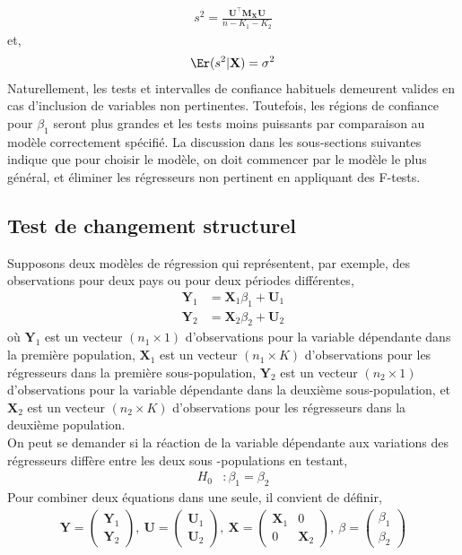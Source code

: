 \begin{align*}
s^2 = \frac{\mathbf{U}^\top\mathbf{M}_\mathbf{X}\mathbf{U}}{n-K_1-K_2}
\end{align*}
et,
\begin{align*}
\Er(s^2|\mathbf{X}) = \sigma^2
\end{align*}
Naturellement, les tests et intervalles de confiance habituels demeurent valides en cas d'inclusion de variables non pertinentes. Toutefois, les régions de confiance pour $\beta_1$ seront plus grandes et les tests moins puissants par comparaison au modèle correctement spécifié. La discussion dans les sous-sections suivantes indique que pour choisir le modèle, on doit commencer par le modèle le plus général, et éliminer les régresseurs non pertinent en appliquant des F-tests.
\subsection{Test de changement structurel}
Supposons deux modèles de régression qui représentent, par exemple, des observations pour deux pays ou pour  deux périodes différentes,
\begin{align*}
\mathbf{Y}_1 &= \mathbf{X}_1\beta_1 + \mathbf{U}_1\\
\mathbf{Y}_2 &= \mathbf{X}_2\beta_2 + \mathbf{U}_2
\end{align*}
où $\mathbf{Y}_1$ est un vecteur $(n_1\times 1)$ d'observations pour la variable dépendante dans la première population, $\mathbf{X}_1$ est un vecteur $(n_1\times K)$ d'observations pour les régresseurs dans la première sous-population,  $\mathbf{Y}_2$ est un vecteur $(n_2\times 1)$ d'observations pour la variable dépendante dans la deuxième sous-population, et $\mathbf{X}_2$ est un vecteur $(n_2\times K)$ d'observations pour les régresseurs dans la deuxième population.\\
On peut se demander si la réaction de la variable dépendante aux variations des régresseurs diffère entre les deux sous -populations en testant,
\begin{align}
H_0 &: \beta_1=\beta_2
\label{eq50}
\end{align}
Pour combiner deux équations dans une seule, il convient de définir,
\begin{align*}
\mathbf{Y} = 
\left(
\begin{array}{c}
\mathbf{Y}_1\\
\mathbf{Y}_2
\end{array}
\right)
, \ 
\mathbf{U} = 
\left(
\begin{array}{c}
\mathbf{U}_1\\
\mathbf{U}_2
\end{array}
\right)
, \
\mathbf{X} = 
\left(
\begin{array}{cc}
\mathbf{X}_1&0\\
0&\mathbf{X}_2
\end{array}
\right)
, \
\beta = 
\left(
\begin{array}{c}
\beta_1\\
\beta_2
\end{array}
\right)
\end{align*}
